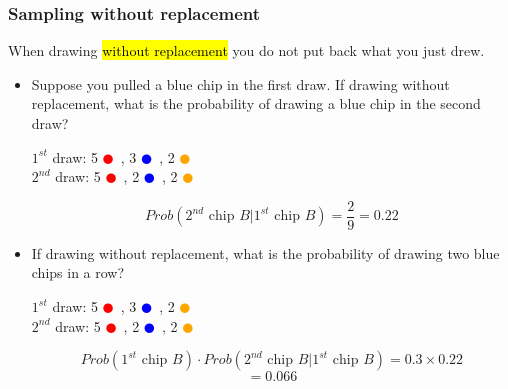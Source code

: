 
\begin{frame}
\frametitle{Sampling without replacement}

When drawing \hl{without replacement} you do not put back what you just drew.

\begin{itemize}

\pause

\item Suppose you pulled a blue chip in the first draw. If drawing without replacement, what is the probability of drawing a blue chip in the second draw?
\pause
\begin{center}
$1^{st}$ draw: 5 \textcolor{red}{$\CIRCLE$}~, 3 \textcolor{blue}{$\CIRCLE$}~, 2 \textcolor{orange}{$\CIRCLE$} \\
\pause
$2^{nd}$ draw: 5 \textcolor{red}{$\CIRCLE$}~, 2 \textcolor{blue}{$\CIRCLE$}~, 2 \textcolor{orange}{$\CIRCLE$}
\end{center}
\pause
\[ Prob(2^{nd} \text{ chip } B | 1^{st} \text{ chip } B) = \frac{2}{9} = 0.22 \]

\pause

\item If drawing without replacement, what is the probability of drawing two blue chips in a row?
\begin{center}

\pause
$1^{st}$ draw: 5 \textcolor{red}{$\CIRCLE$}~, 3 \textcolor{blue}{$\CIRCLE$}~, 2 \textcolor{orange}{$\CIRCLE$} \\
$2^{nd}$ draw: 5 \textcolor{red}{$\CIRCLE$}~, 2 \textcolor{blue}{$\CIRCLE$}~, 2 \textcolor{orange}{$\CIRCLE$}
\end{center}
\pause
\[ Prob(1^{st} \text{ chip } B) \cdot Prob(2^{nd} \text{ chip } B | 1^{st} \text{ chip } B)  = 0.3 \times 0.22 \]
\[ = 0.066 \]

\end{itemize}

\end{frame}


